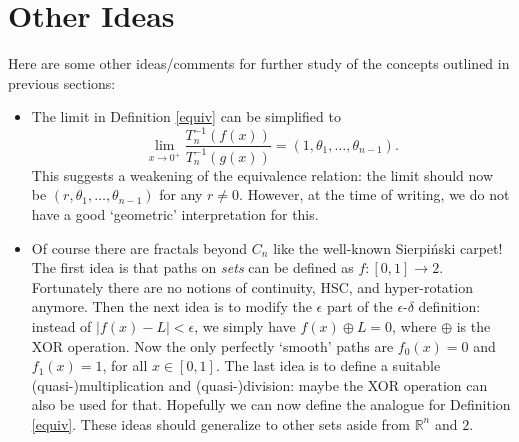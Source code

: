 \documentclass{article}
\theoremstyle{plain}
\begin{document}
\section{Other Ideas}
Here are some other ideas/comments for further study of the concepts outlined in previous sections:
\begin{itemize}
	\item The limit in Definition \ref{equiv} can be simplified to $$\lim_{x \rightarrow 0^+}\frac{T_n^{-1}(f(x))}{T_n^{-1}(g(x))} = (1, \theta_1, \ldots, \theta_{n-1}).$$ This suggests a weakening of the equivalence relation: the limit should now be $(r, \theta_1, \ldots, \theta_{n-1})$ for any $r \ne 0$. However, at the time of writing, we do not have a good `geometric' interpretation for this.
	\item Of course there are fractals beyond $C_n$ like the well-known Sierpiński carpet! The first idea is that paths on \textit{sets} can be defined as $f:[0,1] \rightarrow 2$. Fortunately there are no notions of continuity, HSC, and hyper-rotation anymore. Then the next idea is to modify the $\epsilon$ part of the $\epsilon$-$\delta$ definition: instead of $|f(x)-L|<\epsilon$, we simply have $f(x) \oplus L = 0$, where $\oplus$ is the XOR operation. Now the only perfectly `smooth' paths are $f_0(x)=0$ and $f_1(x)=1$, for all $x\in[0,1]$. The last idea is to define a suitable (quasi-)multiplication and (quasi-)division: maybe the XOR operation can also be used for that. Hopefully we can now define the analogue for Definition \ref{equiv}. These ideas should generalize to other sets aside from $\mathbb{R}^n$ and $2$.
\end{itemize}



\end{document}
